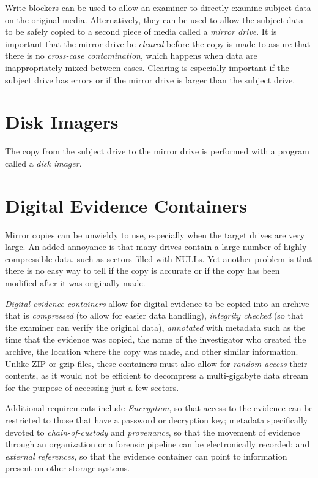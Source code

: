 \documentclass[11pt,letter]{article}
\begin{document}
Write blockers can be used to allow an examiner to directly examine
subject data on the original media. Alternatively, they can be used to allow the subject
data to be safely copied to a second piece of media called a
\emph{mirror drive}. It is important that the mirror drive be
\emph{cleared} before the copy is made to assure that there is no
\emph{cross-case contamination}, which happens when data are
inappropriately mixed between cases. Clearing is especially important
if the subject drive has errors or if the mirror drive is larger than
the subject drive.

\section{Disk Imagers}
The copy from the subject drive to the mirror drive is performed with
a program called a \emph{disk imager}.

\section{Digital Evidence Containers}

Mirror copies can be unwieldy to use, especially when the target
drives are very large. An added annoyance is that many drives contain
a large number of highly compressible data, such as sectors filled
with NULLs. Yet another problem is that there is no easy way to tell
if the copy is accurate or if the copy has been modified after it was
originally made.

\emph{Digital evidence containers} allow for digital evidence to be
copied into an archive that is \emph{compressed} (to allow for easier data
handling), \emph{integrity checked}  (so that the examiner can verify
the original data), \emph{annotated} with metadata such as the time
that the evidence was copied, the name of the investigator who created
the archive, the location where the copy was made, and other similar
information. Unlike ZIP or gzip files, these containers must also
allow for \emph{random access} their contents, as it would not be
efficient to decompress a multi-gigabyte data stream for the purpose
of accessing just a few sectors.

Additional requirements include \emph{Encryption}, so that access to
the evidence can be restricted to those that have a password or
decryption key; metadata specifically devoted to
\emph{chain-of-custody} and \emph{provenance}, so that the movement of
evidence through an organization or a forensic pipeline can be
electronically recorded; and \emph{external references}, so that the
evidence container can point to information present on other storage
systems. 
\end{document}
